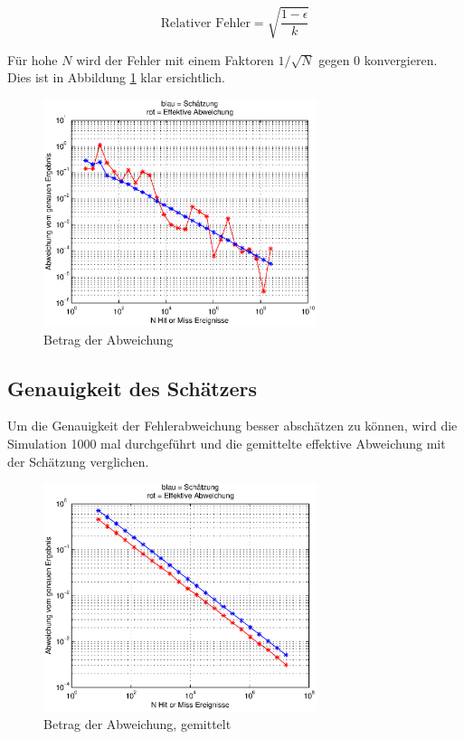 \documentclass{book}
\begin{document}
\begin{refsection}
\begin{equation}
	\text{Relativer Fehler} = \sqrt{\frac{1-\epsilon}{k}} 
	\label{equ:relativer_Fehler}
\end{equation}

Für hohe $N$ wird der Fehler mit einem Faktoren $1 / \sqrt{N}$ gegen $0$ konvergieren. Dies ist in Abbildung \ref{fig:Fehler} klar ersichtlich.

\begin{figure}[h]
    \centering
    \includegraphics[width=8cm]{images/Fehler.eps}
    \caption{Betrag der Abweichung}
    \label{fig:Fehler}
\end{figure}


\subsection{Genauigkeit des Schätzers}

Um die Genauigkeit der Fehlerabweichung besser abschätzen zu können, wird die Simulation 1000 mal durchgeführt und die gemittelte effektive Abweichung mit der Schätzung verglichen.\\

\begin{figure}[h]
    \centering
    \includegraphics[width=8cm]{images/Fehler_gemittelt.eps}
    \caption{Betrag der Abweichung, gemittelt}
    \label{fig:Fehler_gemittelt}
\end{figure}


\end{refsection}
\end{document}
